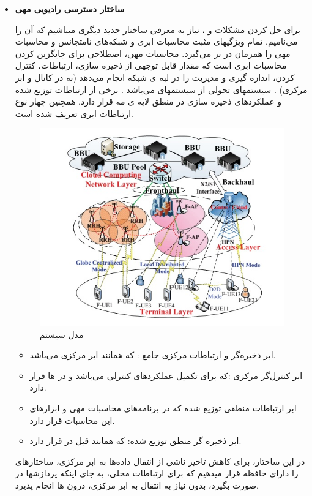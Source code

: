 \begin{itemize}
\item \textbf{ساختار دسترسی رادیویی مهی}


برای حل کردن مشکلات  و ، نیاز به معرفی ساختار جدید دیگری میباشیم که آن را  می‌نامیم.
 تمام ویژگیهای مثبت محاسبات ابری و شبکه‌های نامتجانس و محاسبات مهی را همزمان در بر می‌گیرد.
محاسبات مهی، اصطلاحی برای جایگزین کردن محاسبات ابری است که مقدار قابل توجهی از ذخیره سازی، ارتباطات، کنترل کردن، اندازه گیری و مدیریت را در لبه ی شبکه انجام می‌دهد (نه در کانال و ابر مرکزی) \cite{fogComputing, fogEdge}.
 سیستمهای  تحولی از سیستمهای  می‌باشد . برخی از ارتباطات توزیع شده و عملکردهای ذخیره سازی در منطق لایه ی مه قرار دارد. همچنین چهار نوع ارتباطات ابری تعریف شده است.
  \begin{figure}[H]
  \centering
    \includegraphics[scale =0.7]{./fig/fr}
  \caption{ مدل سیستم  \cite{fogComputing} }
  \label{fig:fr}
\end{figure}
 \begin{itemize}
 \item
 ابر ذخیره‌گر و ارتباطات مرکزی جامع :
 که همانند ابر مرکزی  می‌باشد.
 \item
 ابر کنترل‌گر مرکزی :که برای تکمیل عملکردهای کنترلی می‌باشد و در ها قرار دارد.
 \item
 ابر ارتباطات منطقی توزیع شده که در برنامه‌های محاسبات مهی و ابزارهای این محاسبات قرار دارد.
 \item
  ابر ذخیره گر منطق توزیع شده:
  که همانند قبل در  قرار دارد.
 \end{itemize}
 در این ساختار، برای کاهش تاخیر ناشی از انتقال داده‌ها به ابر مرکزی، ساختارهای  را دارای حافظه قرار میدهیم که برای ارتباطات محلی، به جای اینکه پردازشها در  صورت بگیرد، بدون نیاز به انتقال به ابر مرکزی، درون ها انجام پذیرد. 
\end{itemize}
